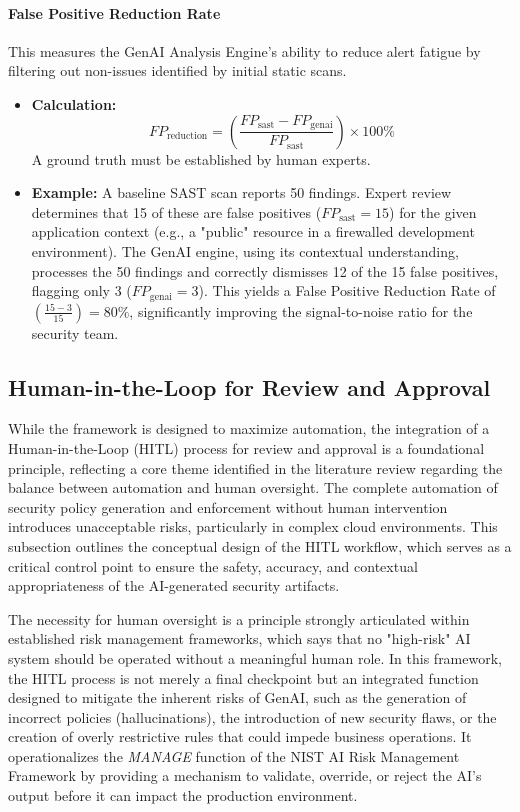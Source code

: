 \paragraph{False Positive Reduction Rate} This measures the GenAI Analysis Engine's ability to reduce alert fatigue by filtering out non-issues identified by initial static scans.
\begin{itemize}
    \item \textbf{Calculation:} \[ FP_{\text{reduction}} = \left(\frac{FP_{\text{sast}} - FP_{\text{genai}}}{FP_{\text{sast}}}\right) \times 100\% \] A ground truth must be established by human experts.
    \item \textbf{Example:} A baseline SAST scan reports 50 findings. Expert review determines that 15 of these are false positives (\( FP_{\text{sast}} = 15 \)) for the given application context (e.g., a "public" resource in a firewalled development environment). The GenAI engine, using its contextual understanding, processes the 50 findings and correctly dismisses 12 of the 15 false positives, flagging only 3 (\( FP_{\text{genai}} = 3 \)). This yields a False Positive Reduction Rate of \( \left(\frac{15 - 3}{15}\right) = 80\% \), significantly improving the signal-to-noise ratio for the security team.
\end{itemize}


\subsection{Human-in-the-Loop for Review and Approval} %
\label{sub:Human-in-the-Loop for Review and Approval}

While the framework is designed to maximize automation, the integration of a Human-in-the-Loop (HITL) process for review and approval is a foundational principle, reflecting a core theme identified in the literature review regarding the balance between automation and human oversight. The complete automation of security policy generation and enforcement without human intervention introduces unacceptable risks, particularly in complex cloud environments. This subsection outlines the conceptual design of the HITL workflow, which serves as a critical control point to ensure the safety, accuracy, and contextual appropriateness of the AI-generated security artifacts.

The necessity for human oversight is a principle strongly articulated within established risk management frameworks, which says that no "high-risk" AI system should be operated without a meaningful human role. In this framework, the HITL process is not merely a final checkpoint but an integrated function designed to mitigate the inherent risks of GenAI, such as the generation of incorrect policies (hallucinations), the introduction of new security flaws, or the creation of overly restrictive rules that could impede business operations. It operationalizes the \textit{MANAGE} function of the NIST AI Risk Management Framework by providing a mechanism to validate, override, or reject the AI's output before it can impact the production environment\cite{barrett_actionable_2023}.


